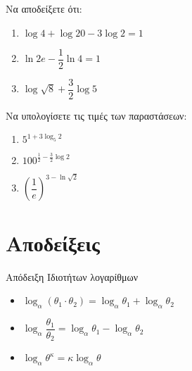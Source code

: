 \documentclass{../presentation}
\begin{document}
\begin{askisi}
  Να αποδείξετε ότι:
  \begin{enumerate}
    \item<1-> $\log 4+\log 20-3\log 2=1$
    \item<2-> $\ln 2e-\dfrac{1}{2}\ln 4=1$
    \item<3-> $\log\sqrt{8}+\dfrac{3}{2}\log 5$
  \end{enumerate}


\end{askisi}

\begin{askisi}
  Να υπολογίσετε τις τιμές των παραστάσεων:
  \begin{enumerate}
    \item<1-> $5^{1+3\log_5 2}$
    \item<2-> $100^{\frac{1}{2}-\frac{3}{2}\log 2}$
    \item<3-> $\left( \dfrac{1}{e} \right)^{3-\ln \sqrt{2}} $
  \end{enumerate}


\end{askisi}

\appendix

\section{Αποδείξεις}
\begin{frame}[label=Απόδειξη1,t]{Απόδειξη Ιδιοτήτων λογαρίθμων}

  \begin{itemize}
    \item<1-> $\log_α\left( θ_1\cdot θ_2 \right)=\log_αθ_1+\log_αθ_2 $
    \item<3-> $\log_α\dfrac{θ_1}{θ_2}=\log_αθ_1-\log_αθ_2 $
    \item<4-> $\log_αθ^κ=κ\log_αθ$
  \end{itemize}



  \hyperlink{Ιδιότητες}{}
\end{frame}
\end{document}
